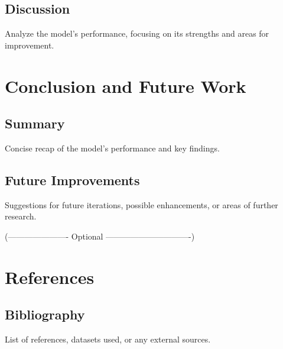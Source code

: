 \documentclass{article}
\begin{document}
\subsection{Discussion}
Analyze the model’s performance, focusing on its strengths and areas for improvement.

\section{Conclusion and Future Work}
\subsection{Summary}
Concise recap of the model's performance and key findings.
\subsection{Future Improvements}
Suggestions for future iterations, possible enhancements, or areas of further research.

(---------------------- Optional -------------------------------)
\section{References}
\subsection{Bibliography}
List of references, datasets used, or any external sources.
\end{document}
